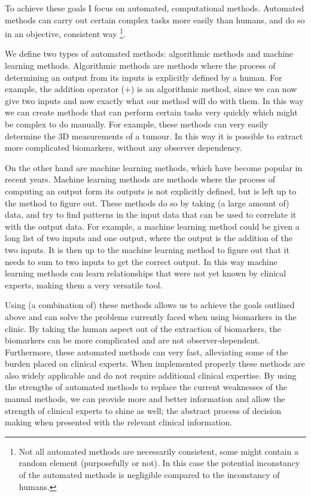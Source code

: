 To achieve these goals I focus on automated, computational methods.
Automated methods can carry out certain complex tasks more easily than humans, and do so in an objective, consistent way \footnote{Not all automated methods are necessarily consistent, some might contain a random element (purposefully or not). In this case the potential inconstancy of the automated methods is negligible compared to the inconstancy of humans.}.

We define two types of automated methods: algorithmic methods and machine learning methods.
Algorithmic methods are methods where the process of determining an output from its inputs is explicitly defined by a human.
For example, the addition operator ($+$) is an algorithmic method, since we can now give two inputs and now exactly what our method will do with them.
In this way we can create methods that can perform certain tasks very quickly which might be complex to do manually.
For example, these methods can very easily determine the 3D measurements of a tumour.
In this way it is possible to extract more complicated biomarkers, without any observer dependency.

On the other hand are machine learning methods, which have become popular in recent years.
Machine learning methods are methods where the process of computing an output form its outputs is not explicitly defined, but is left up to the method to figure out.
These methods do so by taking (a large amount of) data, and try to find patterns in the input data that can be used to correlate it with the output data.
For example, a machine learning method could be given a long list of two inputs and one output, where the output is the addition of the two inputs.
It is then up to the machine learning method to figure out that it needs to sum to two inputs to get the correct output.
In this way machine learning methods can learn relationships that were not yet known by clinical experts, making them a very versatile tool.

Using (a combination of) these methods allows us to achieve the goals outlined above and can solve the problems currently faced when using biomarkers in the clinic.
By taking the human aspect out of the extraction of biomarkers, the biomarkers can be more complicated and are not observer-dependent.
Furthermore, these automated methods can very fast, alleviating some of the burden placed on clinical experts.
When implemented properly these methods are also widely applicable and do not require additional clinical expertise.
By using the strengths of automated methods to replace the current weaknesses of the manual methods, we can provide more and better information and allow the strength of clinical experts to shine as well; the abstract process of decision making when presented with the relevant clinical information.

